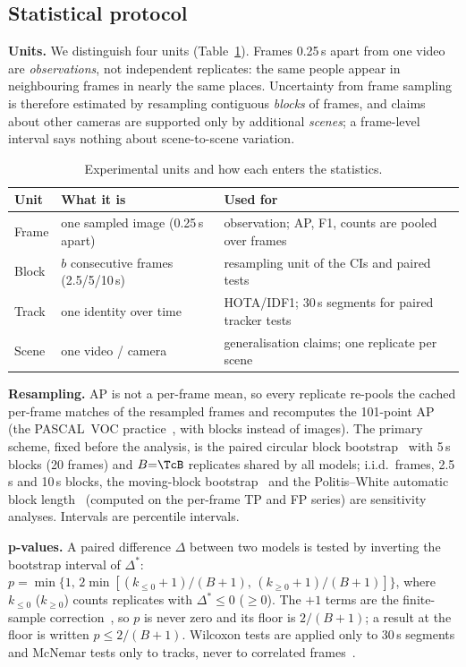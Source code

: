 \subsection{Statistical protocol}
\label{sec:stats}
\textbf{Units.} We distinguish four units (Table~\ref{tab:units}). Frames 0.25\,s apart from one video are
\emph{observations}, not independent replicates: the same people appear in neighbouring frames in nearly the same
places. Uncertainty from frame sampling is therefore estimated by resampling contiguous \emph{blocks} of frames, and
claims about other cameras are supported only by additional \emph{scenes}; a frame-level interval says nothing about
scene-to-scene variation.

\begin{table}[t]
\centering
\caption{Experimental units and how each enters the statistics.}
\label{tab:units}
\footnotesize
\setlength{\tabcolsep}{2.5pt}
\begin{tabular}{p{}p{}p{}}
\toprule
Unit & What it is & Used for \\
\midrule
Frame & one sampled image (0.25\,s apart) & observation; AP, F1, counts are pooled over frames \\
Block & $b$ consecutive frames (2.5/5/10\,s) & resampling unit of the CIs and paired tests \\
Track & one identity over time & HOTA/IDF1; 30\,s segments for paired tracker tests \\
Scene & one video / camera & generalisation claims; one replicate per scene \\
\bottomrule
\end{tabular}
\end{table}

\textbf{Resampling.} AP is not a per-frame mean, so every replicate re-pools the cached per-frame matches of the
resampled frames and recomputes the 101-point AP (the PASCAL~VOC practice~\cite{everingham2015voc}, with blocks
instead of images). The primary scheme, fixed before the analysis, is the paired circular block
bootstrap~\cite{politis1992cbb} with 5\,s blocks (20 frames) and $B{=}\TcB$ replicates shared by all models;
i.i.d.\ frames, 2.5\,s and 10\,s blocks, the moving-block bootstrap~\cite{kunsch1989} and the Politis--White
automatic block length~\cite{politis2004block,patton2009correction} (computed on the per-frame TP and FP series)
are sensitivity analyses. Intervals are percentile intervals.

\textbf{p-values.} A paired difference $\Delta$ between two models is tested by inverting the bootstrap interval
of $\Delta^*$: $p = \min\{1,\,2\min[(k_{\le 0}{+}1)/(B{+}1),\,(k_{\ge 0}{+}1)/(B{+}1)]\}$, where $k_{\le 0}$
($k_{\ge 0}$) counts replicates with $\Delta^*\le 0$ ($\ge 0$). The $+1$ terms are the finite-sample
correction~\cite{phipson2010pvalues}, so $p$ is never zero and its floor is $2/(B{+}1)$; a result at the floor is
written $p\le 2/(B{+}1)$. Wilcoxon tests are applied only to 30\,s segments and McNemar tests only to tracks, never
to correlated frames~\cite{dror2018hitchhiker}.
